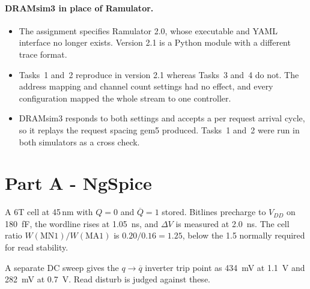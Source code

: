\documentclass[9pt,a4paper]{extarticle}
\begin{document}
\paragraph{DRAMsim3 in place of Ramulator.}
\begin{itemize}
\item The assignment specifies Ramulator 2.0, whose executable and YAML
interface no longer exists. Version 2.1 is a Python module with a
different trace format.
\item Tasks~1 and~2 reproduce in version 2.1 whereas Tasks~3 and~4 do not.
The address mapping and channel count settings had no effect, and every
configuration mapped the whole stream to one controller.
\item DRAMsim3 responds to both settings and accepts a per request arrival
cycle, so it replays the request spacing gem5 produced. Tasks~1 and~2 were
run in both simulators as a cross check.
\end{itemize}






\section{Part A - NgSpice}
\label{sec:a}

A 6T cell at 45\,nm with $Q=0$ and $\overline{Q}=1$ stored. Bitlines
precharge to $V_{DD}$ on \SI{180}{fF}, the wordline rises at
\SI{1.05}{ns}, and $\Delta V$ is measured at \SI{2.0}{ns}. The cell ratio
$W(\mathrm{MN1})/W(\mathrm{MA1})$ is $0.20/0.16 = 1.25$, below the 1.5
normally required for read stability.

A separate DC sweep gives the $q \rightarrow \overline{q}$ inverter trip
point as \SI{434}{mV} at \SI{1.1}{V} and \SI{282}{mV} at \SI{0.7}{V}. Read
disturb is judged against these.
\end{document}
